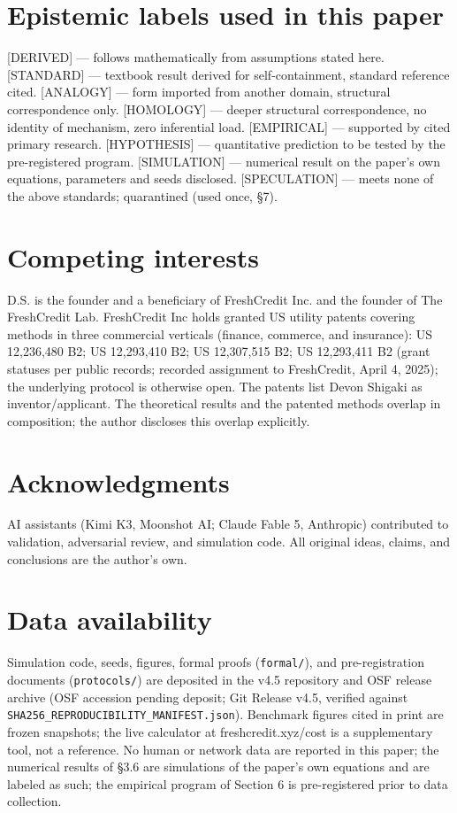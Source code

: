 \documentclass[11pt,twocolumn]{article}
\theoremstyle{gttdef}
\theoremstyle{gttplain}
\begin{document}
\section*{Epistemic labels used in this paper}

[DERIVED] --- follows mathematically from assumptions stated here. [STANDARD] --- textbook result derived for self-containment, standard reference cited. [ANALOGY] --- form imported from another domain, structural correspondence only. [HOMOLOGY] --- deeper structural correspondence, no identity of mechanism, zero inferential load. [EMPIRICAL] --- supported by cited primary research. [HYPOTHESIS] --- quantitative prediction to be tested by the pre-registered program. [SIMULATION] --- numerical result on the paper's own equations, parameters and seeds disclosed. [SPECULATION] --- meets none of the above standards; quarantined (used once, \S{}7).

\section*{Competing interests}

D.S. is the founder and a beneficiary of FreshCredit Inc. and the founder of The FreshCredit Lab. FreshCredit Inc holds granted US utility patents covering methods in three commercial verticals (finance, commerce, and insurance): US 12,236,480 B2; US 12,293,410 B2; US 12,307,515 B2; US 12,293,411 B2 (grant statuses per public records; recorded assignment to FreshCredit, April 4, 2025); the underlying protocol is otherwise open. The patents list Devon Shigaki as inventor/applicant. The theoretical results and the patented methods overlap in composition; the author discloses this overlap explicitly.

\section*{Acknowledgments}

AI assistants (Kimi K3, Moonshot AI; Claude Fable 5, Anthropic) contributed to validation, adversarial review, and simulation code. All original ideas, claims, and conclusions are the author's own.

\section*{Data availability}

Simulation code, seeds, figures, formal proofs (\texttt{formal/}), and pre-registration documents (\texttt{protocols/}) are deposited in the v4.5 repository and OSF release archive (OSF accession pending deposit; Git Release v4.5, verified against \texttt{SHA256\_REPRODUCIBILITY\_MANIFEST.json}). Benchmark figures cited in print are frozen snapshots; the live calculator at freshcredit.xyz/cost is a supplementary tool, not a reference. No human or network data are reported in this paper; the numerical results of \S{}3.6 are simulations of the paper's own equations and are labeled as such; the empirical program of Section 6 is pre-registered prior to data collection.
\end{document}
